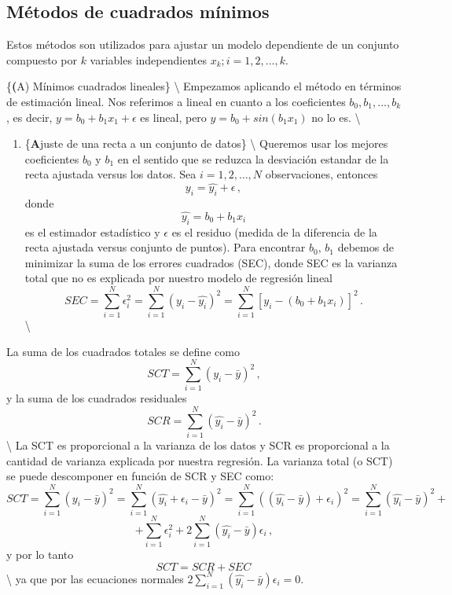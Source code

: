 \documentclass[
]{agujournal2019}
\providecommand{\tightlist}{%
  \setlength{\itemsep}{0pt}\setlength{\parskip}{0pt}}\usepackage{longtable,booktabs,array}
\begin{document}
\hypertarget{muxe9todos-de-cuadrados-muxednimos}{%
\subsection{Métodos de cuadrados
mínimos}\label{muxe9todos-de-cuadrados-muxednimos}}

\noindent Estos métodos son utilizados para ajustar un modelo
dependiente de un conjunto compuesto por \(k\) variables independientes
\(x_k;i=1,2,...,k\).

\vspace{0.5cm}

\{\noindent \textbf (A) \large Mínimos cuadrados lineales\}
\textbackslash{} Empezamos aplicando el método en términos de estimación
lineal. Nos referimos a lineal en cuanto a los coeficientes
\(b_0, b_1,...,b_k\), es decir, \(y=b_0 + b_1x_1 + \epsilon\) es lineal,
pero \(y=b_0+sin(b_1x_1)\) no lo es. \textbackslash{}

\begin{enumerate}
\def\labelenumi{(\arabic{enumi})}
\tightlist
\item
  \{\textbf Ajuste de una recta a un conjunto de datos\}
  \textbackslash{} \noindent Queremos usar los mejores coeficientes
  \(b_0\) y \(b_1\) en el sentido que se reduzca la desviación estandar
  de la recta ajustada versus los datos. Sea \(i=1,2,...,N\)
  observaciones, entonces \[y_i=\hat{y_i} + \epsilon\,,\] donde
  \[\hat{y_i}=b_0+b_1 x_i\] es el estimador estadístico y \(\epsilon\)
  es el residuo (medida de la diferencia de la recta ajustada versus
  conjunto de puntos). Para encontrar \(b_0, \, b_1\) debemos de
  minimizar la suma de los errores cuadrados (SEC), donde SEC es la
  varianza total que no es explicada por nuestro modelo de regresión
  lineal
  \[SEC=\sum^N_{i=1} \epsilon^2_i=\sum^N_{i=1} (y_i - \hat{y_i})^2=\sum^N_{i=1} [y_i - (b_0+b_1 x_i)]^2\,.\]
  \textbackslash{}
\end{enumerate}

La suma de los cuadrados totales se define como
\[SCT=\sum^N_{i=1} (y_i - \bar{y})^2\,,\] y la suma de los cuadrados
residuales \[SCR=\sum^N_{i=1} (\hat{y_i} - \bar{y})^2\,.\]
\textbackslash{} La SCT es proporcional a la varianza de los datos y SCR
es proporcional a la cantidad de varianza explicada por nuestra
regresión. La varianza total (o SCT) se puede descomponer en función de
SCR y SEC como:
\[SCT=\sum^N_{i=1}(y_i-\bar{y})^2 = \sum^N_{i=1}(\hat{y_i} + \epsilon_i - \bar{y})^2
=\sum^N_{i=1}((\hat{y_i}- \bar{y}) + \epsilon_i)^2=\sum^N_{i=1}(\hat{y_i}- \bar{y})^2 +\]
\[+\sum^N_{i=1}\epsilon_i^2 + 2\sum^N_{i=1}(\hat{y_i}- \bar{y})\epsilon_i\,,\]
y por lo tanto \[SCT=SCR + SEC\,\] \textbackslash{} ya que por las
ecuaciones normales \(2\sum^N_{i=1}(\hat{y_i}- \bar{y})\epsilon_i=0\).\\
\end{document}
